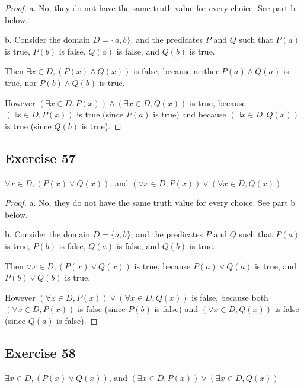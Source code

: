 \documentclass[14pt]{extarticle}
\newcommand{\fa}{\forall}
\newcommand{\te}{\exists}
\begin{document}
\begin{proof}
a. No, they do not have the same truth value for every choice. See part b below.

b. Consider the domain $D = \{a, b\}$, and the predicates $P$ and $Q$ such that $P(a)$ is true, $P(b)$ is false, $Q(a)$ is false, and $Q(b)$ is true.

Then $\te x \in D, (P(x) \wedge Q(x))$ is false, because neither $P(a) \wedge Q(a)$ is true, nor $P(b) \wedge Q(b)$ is true.

However $(\te x \in D, P(x)) \wedge (\te x \in D, Q(x))$ is true, because $(\te x \in D, P(x))$ is true (since $P(a)$ is true) and because $(\te x \in D, Q(x))$ is true (since $Q(b)$ is true).
\end{proof}

\subsection{Exercise 57}
$\fa x \in D, (P(x) \vee Q(x))$, and $(\fa x \in D, P(x)) \vee (\fa x \in D, Q(x))$

\begin{proof}
a. No, they do not have the same truth value for every choice. See part b below.

b. Consider the domain $D = \{a, b\}$, and the predicates $P$ and $Q$ such that $P(a)$ is true, $P(b)$ is false, $Q(a)$ is false, and $Q(b)$ is true.

Then $\fa x \in D, (P(x) \vee Q(x))$ is true, because $P(a) \vee Q(a)$ is true, and $P(b) \vee Q(b)$ is true.

However $(\fa x \in D, P(x)) \vee (\fa x \in D, Q(x))$ is false, because both $(\fa x \in D, P(x))$ is false (since $P(b)$ is false) and $(\fa x \in D, Q(x))$ is false (since $Q(a)$ is false).
\end{proof}

\subsection{Exercise 58}
$\te x \in D, (P(x) \vee Q(x))$, and $(\te x \in D, P(x)) \vee (\te x \in D, Q(x))$
\end{document}
